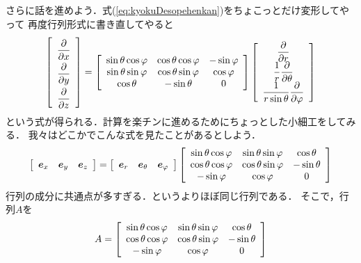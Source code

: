 さらに話を進めよう．式(\ref{eq:kyokuDesopehenkan})をちょこっとだけ変形してやって
再度行列形式に書き直してやると
\begin{align}
\left[
\renewcommand{\arraystretch}{2}
\begin{array}{c}
\dfrac{ \partial } {\partial x} \\
\dfrac{ \partial } {\partial y} \\
\dfrac{ \partial } {\partial z}
\end{array}
\right] = \left[
\renewcommand{\arraystretch}{1}
\begin{array}{ccc}
\sin \theta \cos \varphi & \cos \theta \cos \varphi
& - \sin \varphi \\
\sin \theta \sin \varphi & \cos \theta \sin \varphi
& \cos \varphi \\
\cos \theta & - \sin \theta & 0 
\end{array}
\right] \left[
\begin{array}{c}
\dfrac{ \partial } {\partial r} \\
\dfrac{1}{r} \dfrac{ \partial } {\partial \theta} \\
\dfrac{1}{r \sin \theta } \dfrac{ \partial } {\partial \varphi}
\end{array}
\right] 
\label{eq:kyokuDesopehenkan2}
\end{align}
という式が得られる．計算を楽チンに進めるためにちょっとした小細工をしてみる．
我々はどこかでこんな式を見たことがあるとしよう．
\begin{align}
\renewcommand{\arraystretch}{1}
\left[
\begin{array}{ccc}
\bm{e}_x & \bm{e}_y & \bm{e}_z
\end{array}
\right]
= \left[
\begin{array}{ccc}
\bm{e}_r & \bm{e}_\theta & \bm{e}_\varphi 
\end{array}
\right]
\left[
\begin{array}{ccc} 
\sin \theta \cos \varphi & \sin \theta \sin \varphi & \cos \theta \\
\cos \theta \cos \varphi & \cos \theta \sin \varphi & - \sin \theta \\
- \sin \varphi & \cos \varphi & 0
\end{array}
\right]
\label{eq:kyokuDeskiteihenkanx}
\end{align}
行列の成分に共通点が多すぎる．というよりほぼ同じ行列である．
そこで，行列$A$を
\begin{align*}
A = \left[
\renewcommand{\arraystretch}{1}
\begin{array}{ccc} 
\sin \theta \cos \varphi & \sin \theta \sin \varphi & \cos \theta \\
\cos \theta \cos \varphi & \cos \theta \sin \varphi & - \sin \theta \\
- \sin \varphi & \cos \varphi & 0
\end{array}
\right]
\end{align*}
